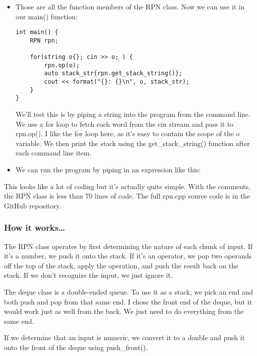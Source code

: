\begin{itemize}
\item 
Those are all the function members of the RPN class. Now we can use it in our main() function:

\begin{lstlisting}[style=styleCXX]
int main() {
	RPN rpn;
	
	for(string o{}; cin >> o; ) {
		rpn.op(o);
		auto stack_str{rpn.get_stack_string()};
		cout << format("{}: {}\n", o, stack_str);
	}
}
\end{lstlisting}

We'll test this is by piping a string into the program from the command line. We use a for loop to fetch each word from the cin stream and pass it to rpn.op(). I like the for loop here, as it's easy to contain the scope of the o variable. We then print the stack using the get\_stack\_string() function after each command line item.


\item 
We can run the program by piping in an expression like this:

\end{itemize}

This looks like a lot of coding but it's actually quite simple. With the comments, the RPN class is less than 70 lines of code. The full rpn.cpp source code is in the GitHub repository.

\subsubsection{How it works…}

The RPN class operates by first determining the nature of each chunk of input. If it's a number, we push it onto the stack. If it's an operator, we pop two operands off the top of the stack, apply the operation, and push the result back on the stack. If we don't recognize the input, we just ignore it.

The deque class is a double-ended queue. To use it as a stack, we pick an end and both push and pop from that same end. I chose the front end of the deque, but it would work just as well from the back. We just need to do everything from the same end.

If we determine that an input is numeric, we convert it to a double and push it onto the front of the deque using push\_front().

